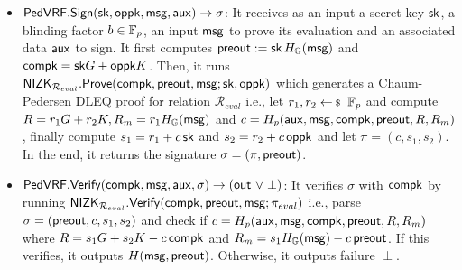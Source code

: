 \begin{itemize}
	\item ${\mathsf{PedVRF}}.{\mathsf{Sign}}(\mathsf{sk},\mathsf{oppk},\mathsf{msg},\mathsf{aux}) \rightarrow \sigma$: It receives as an input a secret key $ \mathsf{sk} $, a blinding factor $ b \in \mathbb{F}_p $, an input $ \mathsf{msg} $ to prove its evaluation and an associated data $ \mathsf{aux} $ to sign.
	It first computes ${\mathsf{preout}} := \mathsf{sk} \, H_{{\mathbb{G}}}(\mathsf{msg})$ and $ \mathsf{compk} = \mathsf{sk} G + \mathsf{oppk}K $. Then, it runs ${\mathsf{NIZK}}_{\mathcal{R}_{eval}}.{\mathsf{Prove}}(\mathsf{compk}, {\mathsf{preout}}, \mathsf{msg};\mathsf{sk},\mathsf{oppk})  $ which generates a Chaum-Pedersen DLEQ proof
	for relation $\mathcal{R}_{eval}$ i.e.,
	let $r_1,r_2 \leftsample \F_p$
	and compute $R = r_1 G + r_2 K, R_m = r_1 H_{{\mathbb{G}}}(\mathsf{msg}) $ and $c = H_p(\mathsf{aux},\mathsf{msg},\mathsf{compk},{\mathsf{preout}},R,R_m)$, finally compute $s_1 = r_1 + c \, \mathsf{sk}$ and $s_2 = r_2 + c \, \mathsf{oppk}$ and let $ \pi = (c,s_1,s_2) $.
	In the end, it returns the signature $\sigma = (\pi, {\mathsf{preout}}) $.
	
	\item ${\mathsf{PedVRF}}.{\mathsf{Verify}}(\mathsf{compk},\mathsf{msg},\mathsf{aux},\sigma) \rightarrow ({\mathsf{out}} \ \vee \perp)$: 
	It verifies $ \sigma $ with  $ \mathsf{compk} $ by running  $ {\mathsf{NIZK}}_{\mathcal{R}_{eval}}.{\mathsf{Verify}}(\mathsf{compk},{\mathsf{preout}},\mathsf{msg}; \pi_{eval} ) $ i.e.,
	parse $\sigma = ({\mathsf{preout}},c,s_1,s_2) $ and check if  
	$c = H_p(\mathsf{aux},\mathsf{msg},\mathsf{compk},{\mathsf{preout}},R,R_m)$ where  $ R = s_1 G + s_2 K - c \, \mathsf{compk}$ 
	and $ R_m = s_1 H_{{\mathbb{G}}}(\mathsf{msg}) - c \, {\mathsf{preout}}$.
	If this verifies, it outputs $H(\mathsf{msg},{\mathsf{preout}})$. Otherwise, it outputs failure $\perp$.
\end{itemize}






